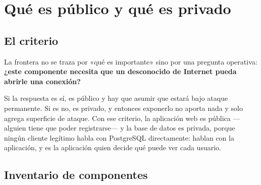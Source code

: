 \documentclass[11pt,letterpaper]{article}
\begin{document}
\section{Qué es público y qué es privado}

\subsection{El criterio}

La frontera no se traza por «qué es importante» sino por una pregunta
operativa: \textbf{¿este componente necesita que un desconocido de Internet
pueda abrirle una conexión?}

Si la respuesta es sí, es público y hay que asumir que estará bajo ataque
permanente. Si es no, es privado, y entonces exponerlo no aporta nada y solo
agrega superficie de ataque. Con ese criterio, la aplicación web es pública
—alguien tiene que poder registrarse— y la base de datos es privada, porque
ningún cliente legítimo habla con PostgreSQL directamente: hablan con la
aplicación, y es la aplicación quien decide qué puede ver cada usuario.

\subsection{Inventario de componentes}
\end{document}
